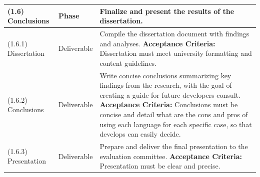\begin{longtable}{|p{3cm}|p{2.5cm}|p{8cm}|}
    (1.6) Conclusions              & Phase                 & Finalize and present the results of the dissertation.                                                                                                                                                                                                                                                                                                     \\ \hline
    (1.6.1) Dissertation           & Deliverable           & Compile the dissertation document with findings and analyses. \newline \textbf{Acceptance Criteria:} Dissertation must meet university formatting and content guidelines.                                                                                                                                                                                 \\ \hline
    (1.6.2) Conclusions            & Deliverable           & Write concise conclusions summarizing key findings from the research, with the goal of creating a guide for future developers consult. \newline \textbf{Acceptance Criteria:} Conclusions must be concise and detail what are the cons and pros of using each language for each specific case, so that develops can easily decide.                        \\ \hline
    (1.6.3) Presentation           & Deliverable           & Prepare and deliver the final presentation to the evaluation committee. \newline \textbf{Acceptance Criteria:} Presentation must be clear and precise.                                                                                                                                                                                                    \\ \hline
\end{longtable}

